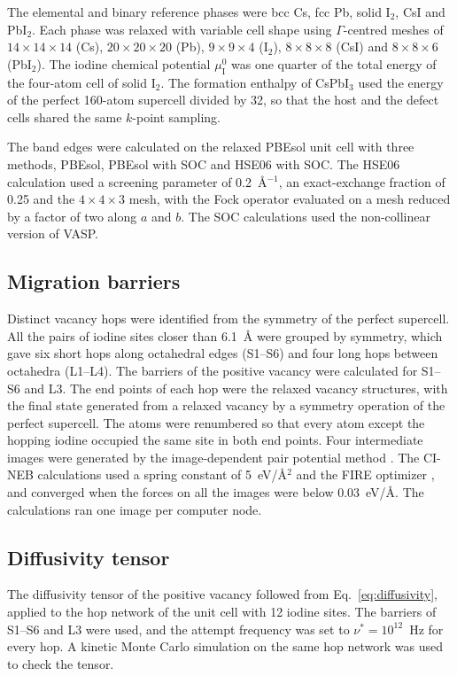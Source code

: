 The elemental and binary reference phases were bcc Cs, fcc Pb, solid I$_2$, CsI and PbI$_2$. Each phase was relaxed with variable cell shape using $\Gamma$-centred meshes of $14\times14\times14$ (Cs), $20\times20\times20$ (Pb), $9\times9\times4$ (I$_2$), $8\times8\times8$ (CsI) and $8\times8\times6$ (PbI$_2$). The iodine chemical potential $\mu_\mathrm{I}^0$ was one quarter of the total energy of the four-atom cell of solid I$_2$. The formation enthalpy of CsPbI$_3$ used the energy of the perfect 160-atom supercell divided by 32, so that the host and the defect cells shared the same $k$-point sampling.

The band edges were calculated on the relaxed PBEsol unit cell with three methods, PBEsol, PBEsol with SOC and HSE06 \citep{Heyd2003,Krukau2006} with SOC. The HSE06 calculation used a screening parameter of 0.2~\AA$^{-1}$, an exact-exchange fraction of 0.25 and the $4\times4\times3$ mesh, with the Fock operator evaluated on a mesh reduced by a factor of two along $a$ and $b$. The SOC calculations used the non-collinear version of VASP.

\subsection{Migration barriers}

Distinct vacancy hops were identified from the symmetry of the perfect supercell. All the pairs of iodine sites closer than 6.1~\AA{} were grouped by symmetry, which gave six short hops along octahedral edges (S1--S6) and four long hops between octahedra (L1--L4). The barriers of the positive vacancy were calculated for S1--S6 and L3. The end points of each hop were the relaxed vacancy structures, with the final state generated from a relaxed vacancy by a symmetry operation of the perfect supercell. The atoms were renumbered so that every atom except the hopping iodine occupied the same site in both end points. Four intermediate images were generated by the image-dependent pair potential method \citep{Smidstrup2014}. The CI-NEB calculations used a spring constant of 5~eV/\AA$^2$ and the FIRE optimizer \citep{Bitzek2006}, and converged when the forces on all the images were below 0.03~eV/\AA. The calculations ran one image per computer node.

\subsection{Diffusivity tensor}

The diffusivity tensor of the positive vacancy followed from Eq.~\ref{eq:diffusivity}, applied to the hop network of the unit cell with 12 iodine sites. The barriers of S1--S6 and L3 were used, and the attempt frequency was set to $\nu^{*} = 10^{12}$~Hz for every hop. A kinetic Monte Carlo simulation on the same hop network was used to check the tensor.

